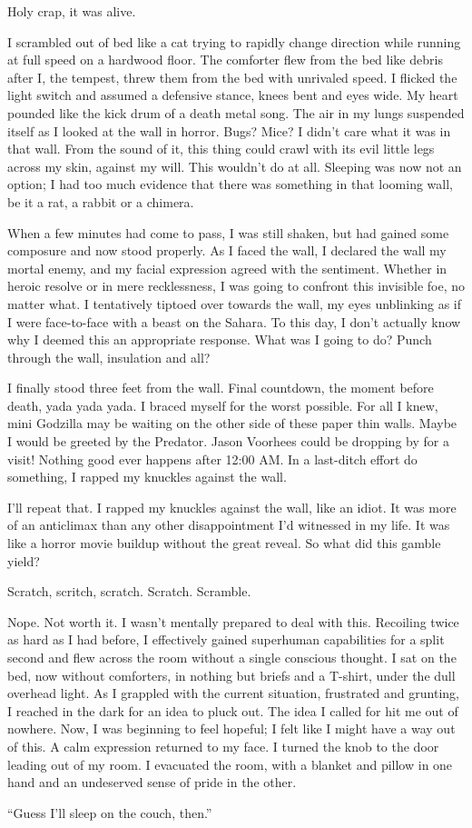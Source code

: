 \documentclass[12pt]{article}
\begin{document}
Holy crap, it was alive.

I scrambled out of bed like a cat trying to rapidly change direction while running at full speed on a hardwood floor.  The comforter flew from the bed like debris after I, the tempest, threw them from the bed with unrivaled speed.  I flicked the light switch and assumed a defensive stance, knees bent and eyes wide.  My heart pounded like the kick drum of a death metal song.  The air in my lungs suspended itself as I looked at the wall in horror.  Bugs?  Mice?  I didn't care what it was in that wall.  From the sound of it, this thing could crawl with its evil little legs across my skin, against my will.  This wouldn't do at all.  Sleeping was now not an option;  I had too much evidence that there was something in that looming wall, be it a rat, a rabbit or a chimera.

When a few minutes had come to pass, I was still shaken, but had gained some composure and now stood properly.  As I faced the wall, I declared the wall my mortal enemy, and my facial expression agreed with the sentiment.  Whether in heroic resolve or in mere recklessness, I was going to confront this invisible foe, no matter what.  I tentatively tiptoed over towards the wall, my eyes unblinking as if I were face-to-face with a beast on the Sahara.  To this day, I don't actually know why I deemed this an appropriate response.  What was I going to do?  Punch through the wall, insulation and all?

I finally stood three feet from the wall.  Final countdown, the moment before death, yada yada yada.  I braced myself for the worst possible.  For all I knew, mini Godzilla may be waiting on the other side of these paper thin walls.  Maybe I would be greeted by the Predator.  Jason Voorhees could be dropping by for a visit!  Nothing good ever happens after 12:00 AM.  In a last-ditch effort do something, I rapped my knuckles against the wall.

I'll repeat that.  I rapped my knuckles against the wall, like an idiot.  It was more of an anticlimax than any other disappointment I'd witnessed in my life.  It was like a horror movie buildup without the great reveal.  So what did this gamble yield?

Scratch, scritch, scratch.  Scratch.  Scramble.

Nope.  Not worth it.  I wasn't mentally prepared to deal with this.  Recoiling twice as hard as I had before, I effectively gained superhuman capabilities for a split second and flew across the room without a single conscious thought.  I sat on the bed, now without comforters, in nothing but briefs and a T-shirt, under the dull overhead light.  As I grappled with the current situation, frustrated and grunting, I reached in the dark for an idea to pluck out.  The idea I called for hit me out of nowhere.  Now, I was beginning to feel hopeful;  I felt like I might have a way out of this.  A calm expression returned to my face.  I turned the knob to the door leading out of my room.  I evacuated the room, with a blanket and pillow in one hand and an undeserved sense of pride in the other.

``Guess I'll sleep on the couch, then.''
\end{document}
